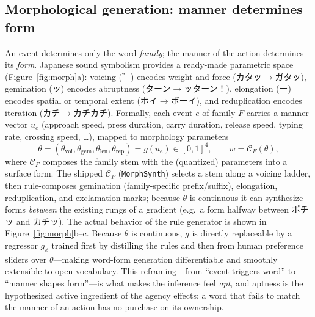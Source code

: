 \documentclass[sigconf,nonacm]{acmart}
\newcommand{\jp}[1]{#1}
\begin{document}
\subsection{Morphological generation: manner determines form}
\label{sec:morph}
An event determines only the word \emph{family}; the manner of the action determines its \emph{form}. Japanese sound symbolism provides a ready-made parametric space (Figure~\ref{fig:morph}a): voicing (\jp{゛}) encodes weight and force (\jp{カタッ}$\rightarrow$\jp{ガタッ}), gemination (\jp{ッ}) encodes abruptness (\jp{ターン}$\rightarrow$\jp{ッターン！}), elongation (\jp{ー}) encodes spatial or temporal extent (\jp{ポイ}$\rightarrow$\jp{ポーイ}), and reduplication encodes iteration (\jp{カチ}$\rightarrow$\jp{カチカチ}). Formally, each event $e$ of family $F$ carries a manner vector $u_e$ (approach speed, press duration, carry duration, release speed, typing rate, crossing speed, \ldots), mapped to morphology parameters
\begin{equation}
\theta = (\theta_{\mathrm{voi}}, \theta_{\mathrm{gem}}, \theta_{\mathrm{len}}, \theta_{\mathrm{rep}}) = g(u_e) \in [0,1]^4,
\qquad w = \mathcal{C}_F(\theta),
\label{eq:morph}
\end{equation}
where $\mathcal{C}_F$ composes the family stem with the (quantized) parameters into a surface form. The shipped $\mathcal{C}_F$ (\texttt{MorphSynth}) selects a stem along a voicing ladder, then rule-composes gemination (family-specific prefix/suffix), elongation, reduplication, and exclamation marks; because $\theta$ is continuous it can synthesize forms \emph{between} the existing rungs of a gradient (e.g.\ a form halfway between \jp{ポチッ} and \jp{カチッ}). The actual behavior of the rule generator is shown in Figure~\ref{fig:morph}b--c. Because $\theta$ is continuous, $g$ is directly replaceable by a regressor $g_\phi$ trained first by distilling the rules and then from human preference sliders over $\theta$---making word-form generation differentiable and smoothly extensible to open vocabulary. This reframing---from ``event triggers word'' to ``manner shapes form''---is what makes the inference feel \emph{apt}, and aptness is the hypothesized active ingredient of the agency effects: a word that fails to match the manner of an action has no purchase on its ownership.
\end{document}
